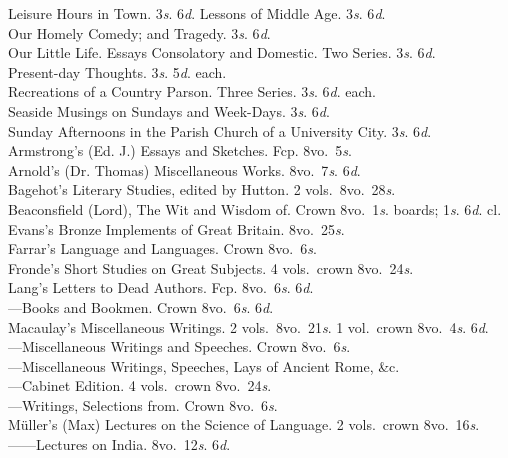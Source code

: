 \documentclass[letterpaper,12pt,oneside,openany]{memoir}
\newcommand{\D}{\hspace*{5mm}}
\newcommand{\E}{\hspace*{2mm}---\hspace*{2mm}}
\begin{document}
\begin{footnotesize}
\D Leisure Hours in Town. 3\textit{s}. 6\textit{d}. Lessons of Middle Age. 3\textit{s}. 6\textit{d}.\\
\D Our Homely Comedy; and Tragedy. 3\textit{s}. 6\textit{d}.\\
\D Our Little Life. Essays Consolatory and Domestic. Two Series. 3\textit{s}. 6\textit{d}.\\
\D Present-day Thoughts. 3\textit{s}. 5\textit{d}. each.\\
\D Recreations of a Country Parson. Three Series. 3\textit{s}. 6\textit{d}. each.\\
\D Seaside Musings on Sundays and Week-Days. 3\textit{s}. 6\textit{d}.\\
\D Sunday Afternoons in the Parish Church of a University City. 3\textit{s}. 6\textit{d}.\\
Armstrong's (Ed. J.) Essays and Sketches. Fcp. 8vo.\ 5\textit{s}.\\
Arnold's (Dr. Thomas) Miscellaneous Works. 8vo.\ 7\textit{s}. 6\textit{d}.\\
Bagehot's Literary Studies, edited by Hutton. 2 vols.\ 8vo.\ 28\textit{s}.\\
Beaconsfield (Lord), The Wit and Wisdom of. Crown 8vo.\ 1\textit{s}. boards; 1\textit{s}. 6\textit{d}. cl.\\
Evans's Bronze Implements of Great Britain. 8vo.\ 25\textit{s}.\\
Farrar's Language and Languages. Crown 8vo.\ 6\textit{s}.\\
Fronde's Short Studies on Great Subjects. 4 vols.\ crown 8vo.\ 24\textit{s}.\\
Lang's Letters to Dead Authors. Fcp. 8vo.\ 6\textit{s}. 6\textit{d}.\\
\E Books and Bookmen. Crown 8vo.\ 6\textit{s}. 6\textit{d}.\\
Macaulay's Miscellaneous Writings. 2 vols.\ 8vo.\ 21\textit{s}. 1 vol.\ crown 8vo.\ 4\textit{s}. 6\textit{d}.\\
\E Miscellaneous Writings and Speeches. Crown 8vo.\ 6\textit{s}.\\
\E Miscellaneous Writings, Speeches, Lays of Ancient Rome, \&c. \\
\E Cabinet Edition. 4 vols.\ crown 8vo.\ 24\textit{s}.\\
\E Writings, Selections from. Crown 8vo.\ 6\textit{s}.\\
M\"uller's (Max) Lectures on the Science of Language. 2 vols.\ crown 8vo.\ 16\textit{s}.\\
\E \E Lectures on India. 8vo.\ 12\textit{s}. 6\textit{d}.\\

\end{footnotesize}
\end{document}
